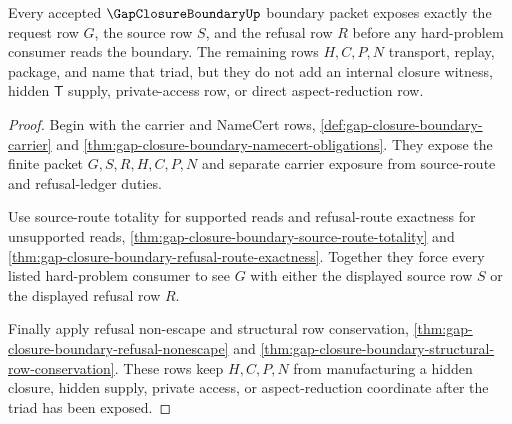 \begin{theorem}
\label{thm:gap-closure-boundary-source-refusal-triad}
Every accepted $\GapClosureBoundaryUp$ boundary packet exposes exactly the request row $G$, the source row $S$, and the refusal row $R$ before any hard-problem consumer reads the boundary. The remaining rows $H,C,P,N$ transport, replay, package, and name that triad, but they do not add an internal closure witness, hidden $\mathsf{T}$ supply, private-access row, or direct aspect-reduction row.
\end{theorem}
\begin{proof}
Begin with the carrier and NameCert rows, \autoref{def:gap-closure-boundary-carrier} and \autoref{thm:gap-closure-boundary-namecert-obligations}. They expose the finite packet $G,S,R,H,C,P,N$ and separate carrier exposure from source-route and refusal-ledger duties.

Use source-route totality for supported reads and refusal-route exactness for unsupported reads, \autoref{thm:gap-closure-boundary-source-route-totality} and \autoref{thm:gap-closure-boundary-refusal-route-exactness}. Together they force every listed hard-problem consumer to see $G$ with either the displayed source row $S$ or the displayed refusal row $R$.

Finally apply refusal non-escape and structural row conservation, \autoref{thm:gap-closure-boundary-refusal-nonescape} and \autoref{thm:gap-closure-boundary-structural-row-conservation}. These rows keep $H,C,P,N$ from manufacturing a hidden closure, hidden supply, private access, or aspect-reduction coordinate after the triad has been exposed.
\end{proof}

